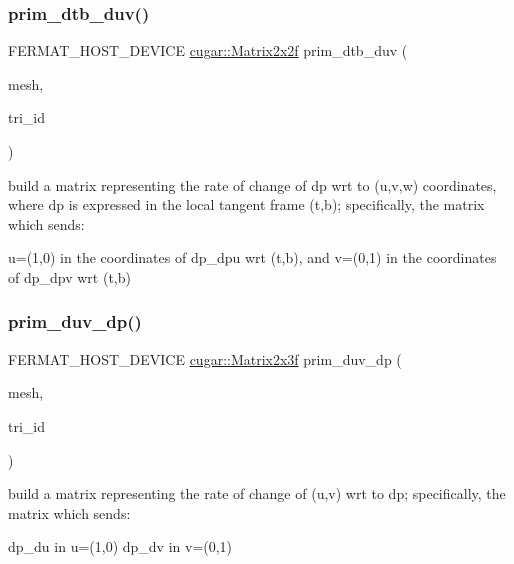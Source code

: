\subsubsection{\texorpdfstring{prim\+\_\+dtb\+\_\+duv()}{prim\_dtb\_duv()}}
{\footnotesize\ttfamily F\+E\+R\+M\+A\+T\+\_\+\+H\+O\+S\+T\+\_\+\+D\+E\+V\+I\+CE \hyperlink{structcugar_1_1_matrix}{cugar\+::\+Matrix2x2f} prim\+\_\+dtb\+\_\+duv (\begin{DoxyParamCaption}\item[{const \hyperlink{struct_mesh_view}{Mesh\+View} \&}]{mesh,  }\item[{const uint32}]{tri\+\_\+id }\end{DoxyParamCaption})\hspace{0.3cm}{\ttfamily [inline]}}

build a matrix representing the rate of change of dp wrt to (u,v,w) coordinates, where dp is expressed in the local tangent frame (t,b); specifically, the matrix which sends\+:

u=(1,0) in the coordinates of dp\+\_\+dpu wrt (t,b), and v=(0,1) in the coordinates of dp\+\_\+dpv wrt (t,b) \mbox{\label{group___mesh_module_gaeb63648183e2a7d1d2e037540414c838}} 
\subsubsection{\texorpdfstring{prim\+\_\+duv\+\_\+dp()}{prim\_duv\_dp()}}
{\footnotesize\ttfamily F\+E\+R\+M\+A\+T\+\_\+\+H\+O\+S\+T\+\_\+\+D\+E\+V\+I\+CE \hyperlink{structcugar_1_1_matrix}{cugar\+::\+Matrix2x3f} prim\+\_\+duv\+\_\+dp (\begin{DoxyParamCaption}\item[{const \hyperlink{struct_mesh_view}{Mesh\+View} \&}]{mesh,  }\item[{const uint32}]{tri\+\_\+id }\end{DoxyParamCaption})\hspace{0.3cm}{\ttfamily [inline]}}

build a matrix representing the rate of change of (u,v) wrt to dp; specifically, the matrix which sends\+:

dp\+\_\+du in u=(1,0) dp\+\_\+dv in v=(0,1) \mbox{\label{group___mesh_module_gafd6fb57679fabecda3d5837dc29e3401}} 
